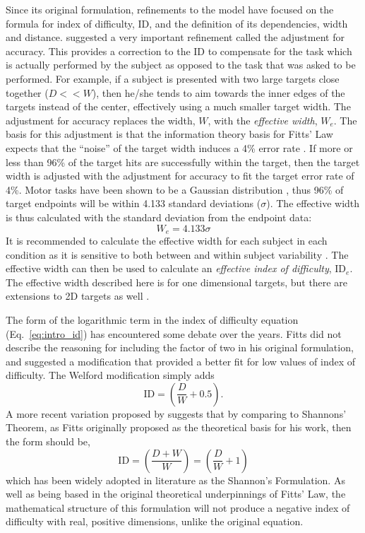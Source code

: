 Since its original formulation, refinements to the model have focused on the formula for index of difficulty, \(\text{ID}\), and the definition of its dependencies, width and distance.
\citet{crossman_speed_1957} suggested a very important refinement called the adjustment for accuracy.
This provides a correction to the \(\text{ID}\) to compensate for the task which is actually performed by the subject as opposed to the task that was asked to be performed.
For example, if a subject is presented with two large targets close together ($D << W$), then he/she tends to aim towards the inner edges of the targets instead of the center, effectively using a much smaller target width.
The adjustment for accuracy replaces the width, \(W\), with the \emph{effective width}, \(W_{e}\).
The basis for this adjustment is that the information theory basis for Fitts' Law expects that the ``noise'' of the target width induces a 4\% error rate \citep{mackenzie_fitts_1992}.
If more or less than 96\% of the target hits are successfully within the target, then the target width is adjusted with the adjustment for accuracy to fit the target error rate of 4\%.
Motor tasks have been shown to be a Gaussian distribution \citep{crossman_feedback_1983,woodworth_accuracy_1899}, thus 96\% of target endpoints will be within 4.133 standard deviations (\(\sigma\)).
The effective width is thus calculated with the standard deviation from the endpoint data:
\begin{equation}
W_{e} = 4.133\sigma
\end{equation}
It is recommended to calculate the effective width for each subject in each condition as it is sensitive to both between and within subject variability \citep{soukoreff_towards_2004}.
The effective width can then be used to calculate an \emph{effective index of difficulty}, \(\text{ID}_{e}\).
The effective width described here is for one dimensional targets, but there are extensions to 2D targets as well \citep{murata_extending_2001}.

The form of the logarithmic term in the index of difficulty equation (Eq.\ \ref{eq:intro_id}) has encountered some debate over the years.
Fitts did not describe the reasoning for including the factor of two in his original formulation, and \citet{welford_fundamentals_1968} suggested a modification that provided a better fit for low values of index of difficulty.
The Welford modification simply adds
\begin{equation}
    \mathrm{ID} = \left( \frac{D}{W} + 0.5 \right).
\end{equation}
A more recent variation proposed by \citet{mackenzie_note_1989} suggests that by comparing to Shannons' Theorem, as Fitts originally proposed as the theoretical basis for his work, then the form should be,
\begin{equation}
    \mathrm{ID} = \left( \frac{D + W}{W} \right) = \left( \frac{D}{W} + 1 \right)
\end{equation}
which has been widely adopted in literature as the Shannon's Formulation.
As well as being based in the original theoretical underpinnings of Fitts' Law, the mathematical structure of this formulation will not produce a negative index of difficulty with real, positive dimensions, unlike the original equation.


